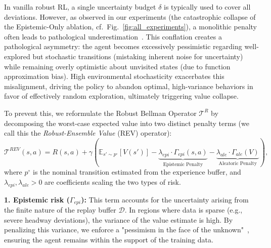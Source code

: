 \documentclass[10pt]{article}
\begin{document}
In vanilla robust RL, a single uncertainty budget $\delta$ is typically used to cover all deviations. However, as observed in our experiments (the catastrophic collapse of the Epistemic-Only ablation, cf.\ Fig.~\ref{fig:all_experiments}), a monolithic penalty often leads to pathological underestimation~\cite{Ji2024SeizingSerendipity}. This conflation creates a pathological asymmetry: the agent becomes excessively pessimistic regarding well-explored but stochastic transitions (mistaking inherent noise for uncertainty) while remaining overly optimistic about unvisited states (due to function approximation bias). High environmental stochasticity exacerbates this misalignment, driving the policy to abandon optimal, high-variance behaviors in favor of effectively random exploration, ultimately triggering value collapse.

To prevent this, we reformulate the Robust Bellman Operator $\mathcal{T}^R$ by decomposing the worst-case expected value into two distinct penalty terms (we call this the \textit{Robust-Ensemble Value} (REV) operator):
\begin{equation}
    \mathcal{T}^{REV}(s, a) = R(s, a) + \gamma \left( \mathbb{E}_{s' \sim p^\circ} [V(s')] - \underbrace{\lambda_{epi} \cdot \Gamma_{epi}(s, a)}_{\text{Epistemic Penalty}} - \underbrace{\lambda_{ale} \cdot \Gamma_{ale}(V)}_{\text{Aleatoric Penalty}} \right),
\end{equation}
where $p^\circ$ is the nominal transition estimated from the experience buffer, and $\lambda_{epi}, \lambda_{ale} > 0$ are coefficients scaling the two types of risk.

\textbf{1. Epistemic risk ($\Gamma_{epi}$):} This term accounts for the uncertainty arising from the finite nature of the replay buffer $\mathcal{D}$. In regions where data is sparse (e.g., severe headway deviations), the variance of the value estimate is high. By penalizing this variance, we enforce a "pessimism in the face of the unknown"~\cite{An2021UncertaintyEnsemble}, ensuring the agent remains within the support of the training data.
\end{document}
